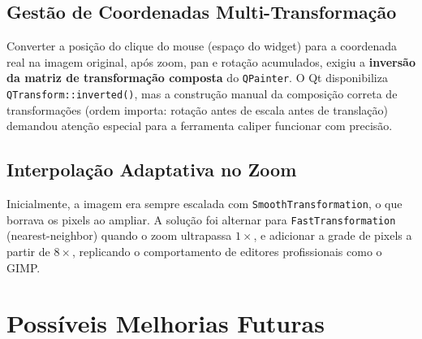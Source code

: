 \documentclass[12pt, a4paper]{article}
\begin{document}
\subsection{Gestão de Coordenadas Multi-Transformação}

Converter a posição do clique do mouse (espaço do widget) para a coordenada
real na imagem original, após zoom, pan e rotação acumulados, exigiu a
\textbf{inversão da matriz de transformação composta} do \texttt{QPainter}. O
Qt disponibiliza \texttt{QTransform::inverted()}, mas a construção manual da
composição correta de transformações (ordem importa: rotação antes de escala
antes de translação) demandou atenção especial para a ferramenta caliper
funcionar com precisão.

\subsection{Interpolação Adaptativa no Zoom}

Inicialmente, a imagem era sempre escalada com \texttt{SmoothTransformation},
o que borrava os pixels ao ampliar. A solução foi alternar para
\texttt{FastTransformation} (nearest-neighbor) quando o zoom ultrapassa $1\times$,
e adicionar a grade de pixels a partir de $8\times$, replicando o comportamento
de editores profissionais como o GIMP.

\section{Possíveis Melhorias Futuras}
\end{document}
